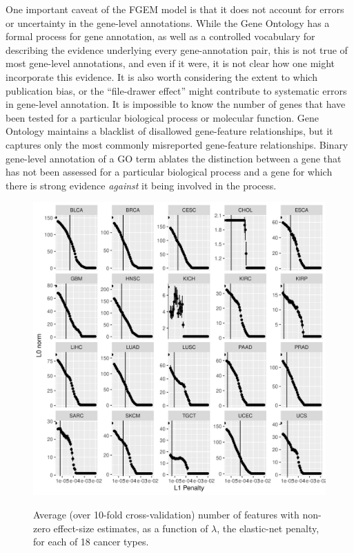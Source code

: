 One important caveat of the FGEM model is that it does not account for errors or uncertainty in the gene-level annotations.  While the Gene Ontology has a formal process for gene annotation, as well as a controlled vocabulary for describing the evidence underlying every gene-annotation pair, this is not true of most gene-level annotations, and even if it were, it is not clear how one might incorporate this evidence.  It is also worth considering the extent to which publication bias, or the ``file-drawer effect'' might contribute to systematic errors in gene-level annotation. It is impossible to know the number of genes that have been tested for a particular biological process or molecular function.  Gene Ontology maintains a blacklist of disallowed gene-feature relationships\cite{huntley14_under_how_why_gene_ontol}, but it captures only the most commonly misreported gene-feature relationships.  Binary gene-level annotation of a GO term ablates the distinction between a gene that has not been assessed for a particular biological process and a gene for which there is strong evidence \emph{against} it being involved in the process.


\begin{figure}
    \centering
    \includegraphics[width=.9\linewidth]{img/cv_l0.png}
    \label{fig:cv_l0}
    \caption{Average (over 10-fold cross-validation) number of features with non-zero effect-size estimates, as a function of $\lambda$, the elastic-net penalty, for each of 18 cancer types.}
\end{figure}

